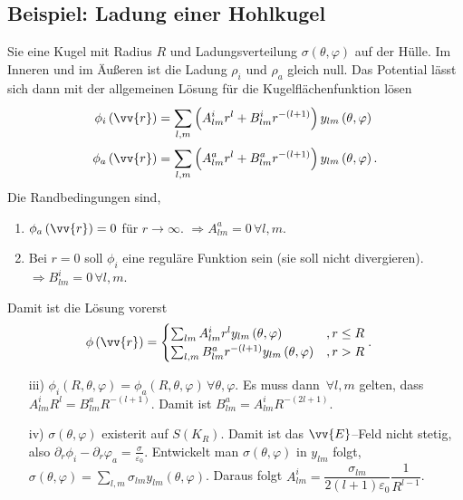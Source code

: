 \documentclass[a4paper,12pt]{article}
\numberwithin{equation}{section}
\begin{document}
\subsection{Beispiel: Ladung einer Hohlkugel}
Sie eine Kugel mit Radius $R$ und Ladungsverteilung $\sigma \left(\theta ,\varphi \right)$ auf der Hülle. Im Inneren und im Äußeren ist die Ladung $\rho _i$ und $\rho _a$ gleich null. Das Potential lässt sich dann mit der allgemeinen Lösung für die Kugelflächenfunktion lösen
\begin{align} 
        \phi _i\left(\vv{r}\right)&=\sum_{l,m}^{}\left(A^i_{l m}r^l+B^i_{l m}r^{-\left(l+1\right)}\right)y_{l m}\left(\theta ,\varphi \right)\\
        \phi _a\left(\vv{r}\right)&=\sum_{l,m}^{}\left(A^a_{l m}r^l+B^a_{l m}r^{-\left(l+1\right)}\right)y_{l m}\left(\theta ,\varphi \right)
.\end{align} 
Die Randbedingungen sind,
\begin{enumerate}[label=\roman*)]
        \item $\phi _a\left(\vv{r}\right)=0$ für $r\rightarrow \infty$. $\Rightarrow A_{l m}^a=0\,\forall l,m$.
        \item Bei $r=0$ soll $\phi _i$ eine reguläre Funktion sein (sie soll nicht divergieren).$\Rightarrow B_{l m}^i=0\,\forall l,m$.
\end{enumerate}
Damit ist die Lösung vorerst
\begin{align} 
        \phi \left(\vv{r}\right)&=\begin{cases}
                \sum_{l m}^{}A_{l m}^ir^ly_{l m}\left(\theta ,\varphi \right)&,r\leq R\\
                \sum_{l,m}^{}B_{l m}^ar^{-\left(l+1\right)}y_{l m}\left(\theta ,\varphi \right)&,r>R
        \end{cases}
.\end{align} 
\begin{enumerate}[label=\roman*)]
        \item[iii)] $\phi _i\left(R,\theta ,\varphi \right)=\phi _a\left(R,\theta ,\varphi \right)\,\forall \theta ,\varphi $. Es muss dann $\,\forall l,m$ gelten, dass $A^i_{l m}R^l=B_{l m}^aR^{-\left(l+1\right)}$. Damit ist $B_{l m}^a=A^i_{l m}R^{-(2l+1)}$.
        \item[iv)] $\sigma \left(\theta ,\varphi \right)$ existerit auf $S\left(K_R\right)$. Damit ist das $\vv{E}$--Feld nicht stetig, also $\partial_r \phi _i-\partial_r \varphi _a=\tfrac{\sigma }{\varepsilon _0}$. Entwickelt man $\sigma \left(\theta ,\varphi \right)$ in $y_{l m}$ folgt, $\sigma \left(\theta ,\varphi \right)=\sum_{l,m}^{}\sigma _{l m}y_{l m}\left(\theta ,\varphi \right)$. Daraus folgt $A_{l m}^i=\dfrac{\sigma _{l m}}{2\left(l+1\right)\varepsilon _0}\dfrac{1}{R^{l-1}}$.
\end{enumerate}
\end{document}
